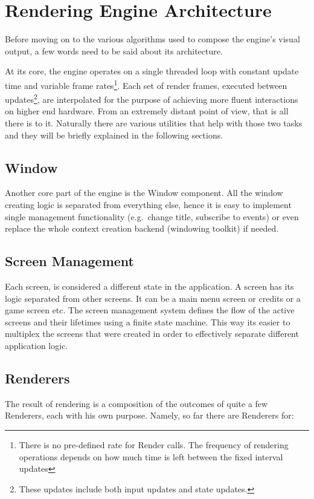 \section{Rendering Engine Architecture}
Before moving on to the various algorithms used to compose the engine's visual output, a few
words need to be said about its architecture.

At its core, the engine operates on a single threaded loop with constant update time and
variable frame rates\footnote{There is no pre-defined rate for Render calls. The frequency of
rendering operations depends on how much time is left between the fixed interval updates}.
Each set of render frames, executed between updates\footnote{These updates include both input
updates and state updates.}, are interpolated for the purpose of achieving more fluent interactions
on higher end hardware. From an extremely distant point of view, that is all there is to it.
Naturally there are various utilities that help with those two tasks and they will be briefly
explained in the following sections.

\subsection{Window}
Another core part of the engine is the Window component. All the window creating logic
is separated from everything else, hence it is easy to implement single management functionality
(e.g.\ change title, subscribe to events) or even replace the whole context creation backend
(windowing toolkit) if needed.

\subsection{Screen Management}
Each screen, is considered a different state in the application. A screen has its logic separated
from other screens. It can be a main menu screen or credits or a game screen etc. The screen management
system defines the flow of the active screens and their lifetimes using a finite state machine. This
way its easier to multiplex the screens that were created in order to effectively separate different
application logic.

\subsection{Renderers}
The result of rendering is a composition of the outcomes of quite a few Renderers, each
with his own purpose. Namely, so far there are Renderers for:

